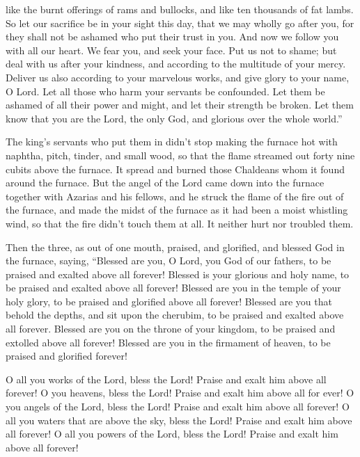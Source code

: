 {like the burnt offerings of rams and bullocks, and like ten thousands of fat lambs. So let our sacrifice be in your sight this day, that we may wholly go after you, for they shall not be ashamed who put their trust in you.
And now we follow you with all our heart. We fear you, and seek your face.
Put us not to shame; but deal with us after your kindness, and according to the multitude of your mercy.
Deliver us also according to your marvelous works, and give glory to your name, O Lord. Let all those who harm your servants be confounded.
Let them be ashamed of all their power and might, and let their strength be broken.
Let them know that you are the Lord, the only God, and glorious over the whole world.”
\par }{\PP {}The king’s servants who put them in didn’t stop making the furnace hot with naphtha, pitch, tinder, and small wood,
so that the flame streamed out forty nine cubits above the furnace.
It spread and burned those Chaldeans whom it found around the furnace.
But the angel of the Lord came down into the furnace together with Azarias and his fellows, and he struck the flame of the fire out of the furnace,
and made the midst of the furnace as it had been a moist whistling wind, so that the fire didn’t touch them at all. It neither hurt nor troubled them.
\par }{\PP {}Then the three, as out of one mouth, praised, and glorified, and blessed God in the furnace, saying,
“Blessed are you, O Lord, you God of our fathers, to be praised and exalted above all forever!
Blessed is your glorious and holy name, to be praised and exalted above all forever!
Blessed are you in the temple of your holy glory, to be praised and glorified above all forever!
Blessed are you that behold the depths, and sit upon the cherubim, to be praised and exalted above all forever.
Blessed are you on the throne of your kingdom, to be praised and extolled above all forever!
Blessed are you in the firmament of heaven, to be praised and glorified forever!
\par }{\PP {}O all you works of the Lord, bless the Lord! Praise and exalt him above all forever!
O you heavens, bless the Lord! Praise and exalt him above all for ever!
O you angels of the Lord, bless the Lord! Praise and exalt him above all forever!
O all you waters that are above the sky, bless the Lord! Praise and exalt him above all forever!
O all you powers of the Lord, bless the Lord! Praise and exalt him above all forever!
}

